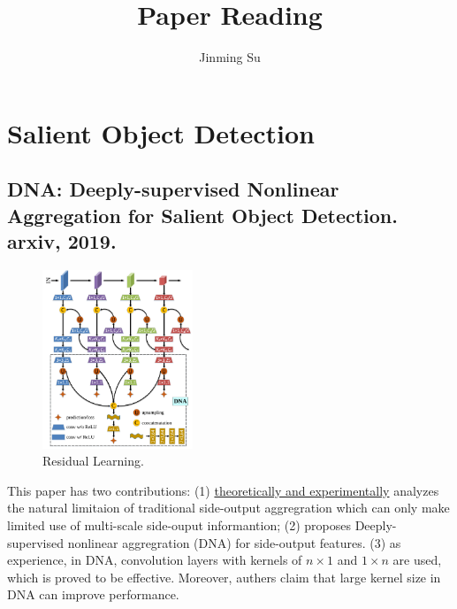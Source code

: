 \documentclass[10pt,onecolumn]{book}
\begin{document}
\date{}

\title{\textbf{Paper Reading}}
\author{Jinming Su}

\maketitle

\thispagestyle{empty}
\newpage
{}
\newpage
\tableofcontents
\newpage
\listoftodos

\newpage
{}
\mainmatter

\chapter{Salient Object Detection}
\section{DNA: Deeply-supervised Nonlinear Aggregation for Salient Object Detection. arxiv, 2019.}
\begin{figure}[h]
\centering
\includegraphics[width=0.4\textwidth]{figures_paper_reading/DNA_Deeply-supervised_Nonlinear_Aggregation_for_Salient_Object_Detection.png}
\caption{Residual Learning.}
\label{fig:1-1_residual_learning}
\end{figure}

This paper has two contributions: 
(1) \uline{theoretically and experimentally} analyzes the natural limitaion of traditional side-output aggregration which can only make limited use of multi-scale side-ouput informantion; 
(2) proposes Deeply-supervised nonlinear aggregration (DNA) for side-output features. 
(3) as experience, in DNA, convolution layers with kernels of $n \times 1$ and $1 \times n$ are used, which is proved to be effective. Moreover, authers claim that large kernel size in DNA can improve performance.
\end{document}
